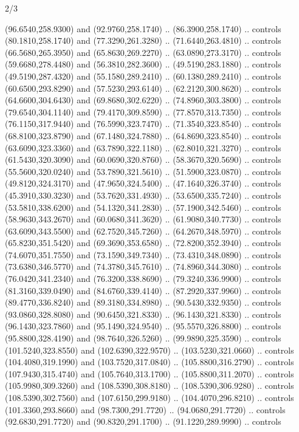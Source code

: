 \begin{flagdescription}{2/3}
\begin{scope}[shift={(0.5\flaglength,0.5)},scale=\flagwidth/480]
\begin{scope}[y=0.8pt, x=0.80pt, yscale=-1,shift={(-450,-300)}]
\begin{scope}[cm={{1.02948,0.0,0.0,1.02948,(-13.26599,6.99414)}}]
\begin{scope}[shift={(341.0917,90.34325)}]
  (96.6540,258.9300) and (92.9760,258.1740) .. (86.3900,258.1740) .. controls
  (80.1810,258.1740) and (77.3290,261.3280) .. (71.6440,263.4810) .. controls
  (66.5680,265.3950) and (65.8630,269.2270) .. (63.0890,273.3170) .. controls
  (59.6680,278.4480) and (56.3810,282.3600) .. (49.5190,283.1880) .. controls
  (49.5190,287.4320) and (55.1580,289.2410) .. (60.1380,289.2410) .. controls
  (60.6500,293.8290) and (57.5230,293.6140) .. (62.2120,300.8620) .. controls
  (64.6600,304.6430) and (69.8680,302.6220) .. (74.8960,303.3800) .. controls
  (79.6540,304.1140) and (79.4170,309.8590) .. (77.8570,313.7350) .. controls
  (76.1150,317.9440) and (76.5990,323.7470) .. (71.3540,323.8540) .. controls
  (68.8100,323.8790) and (67.1480,324.7880) .. (64.8690,323.8540) .. controls
  (63.6090,323.3360) and (63.7890,322.1180) .. (62.8010,321.3270) .. controls
  (61.5430,320.3090) and (60.0690,320.8760) .. (58.3670,320.5690) .. controls
  (55.5600,320.0240) and (53.7890,321.5610) .. (51.5900,323.0870) .. controls
  (49.8120,324.3170) and (47.9650,324.5400) .. (47.1640,326.3740) .. controls
  (45.3910,330.3230) and (53.7620,331.4930) .. (53.6500,335.7240) .. controls
  (53.5810,338.6200) and (54.1320,341.2830) .. (57.1900,342.5460) .. controls
  (58.9630,343.2670) and (60.0680,341.3620) .. (61.9080,340.7730) .. controls
  (63.6090,343.5500) and (62.7520,345.7260) .. (64.2670,348.5970) .. controls
  (65.8230,351.5420) and (69.3690,353.6580) .. (72.8200,352.3940) .. controls
  (74.6070,351.7550) and (73.1590,349.7340) .. (73.4310,348.0890) .. controls
  (73.6380,346.5770) and (74.3780,345.7610) .. (74.8960,344.3080) .. controls
  (76.0420,341.2340) and (76.3200,338.8690) .. (79.3240,336.9900) .. controls
  (81.3160,339.0490) and (84.6760,339.4140) .. (87.2920,337.9960) .. controls
  (89.4770,336.8240) and (89.3180,334.8980) .. (90.5430,332.9350) .. controls
  (93.0860,328.8080) and (90.6450,321.8330) .. (96.1430,321.8330) .. controls
  (96.1430,323.7860) and (95.1490,324.9540) .. (95.5570,326.8800) .. controls
  (95.8800,328.4190) and (98.7640,326.5260) .. (99.9890,325.3590) .. controls
  (101.5240,323.8550) and (102.6390,322.9570) .. (103.5230,321.0660) .. controls
  (104.4080,319.1990) and (103.7520,317.0840) .. (105.8800,316.2790) .. controls
  (107.9430,315.4740) and (105.7640,313.1700) .. (105.8800,311.2070) .. controls
  (105.9980,309.3260) and (108.5390,308.8180) .. (108.5390,306.9280) .. controls
  (108.5390,302.7560) and (107.6150,299.9180) .. (104.4070,296.8210) .. controls
  (101.3360,293.8660) and (98.7300,291.7720) .. (94.0680,291.7720) .. controls
  (92.6830,291.7720) and (90.8320,291.1700) .. (91.1220,289.9990) .. controls

\end{scope}
\end{scope}
\end{scope}
\end{scope}
\end{flagdescription}
